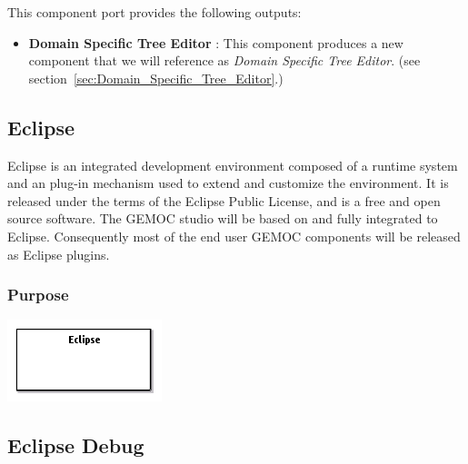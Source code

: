 \documentclass{gemoc} %
\begin{document}
This component port provides the following outputs:
\begin{itemize}
  \item \textbf{Domain Specific Tree Editor} :
This component produces a new component that we will reference as \emph{Domain Specific Tree Editor}.
(see section~\ref{sec:Domain_Specific_Tree_Editor}.)
\end{itemize}


\subsection{Eclipse}
\label{sec:Eclipse}
Eclipse is an integrated development environment composed of a runtime system and an plug-in mechanism used to extend and customize the environment. It is released under the terms of the Eclipse Public License, and is a free and open source software. The GEMOC studio will be based on and fully integrated to Eclipse. Consequently most of the end user GEMOC components will be released as Eclipse plugins.

\subsubsection{Purpose}


\begin{center}
\includegraphics*[trim=0.0cm 0.0cm 0cm 0.0cm, clip=true]{../images/generated/Generated_Eclipse.png}
\end{center}




\subsection{Eclipse Debug}
\label{sec:Eclipse_Debug}

\end{document}
